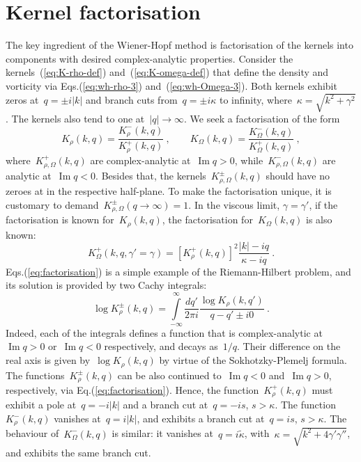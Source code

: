 \documentclass[preprint,aps,eqsecnum]{revtex4-1}
\newcommand{\fplus}[1]{{#1}^{+}}
\newcommand{\fminus}[1]{{#1}^{-}}
\newcommand{\fplusminus}[1]{{#1}^{\pm}}
\renewcommand{\Im}{\mathop{\mathrm{Im}}\nolimits}
\begin{document}
\section{Kernel factorisation}
\label{sec:factorisation}
The key ingredient of the Wiener-Hopf method is factorisation of the kernels
into components with desired complex-analytic properties.
Consider the kernels~(\ref{eq:K-rho-def}) and~(\ref{eq:K-omega-def})
that define the density and vorticity via Eqs.(\ref{eq:wh-rho-3})
and~(\ref{eq:wh-Omega-3}).
Both  kernels exhibit zeros at~$q = \pm i |k|$ and branch cuts
from~$q = \pm i \kappa$ to infinity, where~$\kappa = \sqrt{k^2 + \gamma^2}$.
The kernels also
tend to one at~$|q| \to \infty$. We seek a factorisation of the form
\begin{equation}
  \label{eq:factorisation}
  K_\rho(k, q) = \frac{\fminus{K}_\rho(k, q)}{\fplus{K}_\rho(k, q)}
  \ ,
  \qquad
  K_\Omega(k, q) = \frac{\fminus{K}_\Omega(k, q)}{\fplus{K}_\Omega(k, q)}
  \ ,
\end{equation}
where~$\fplus{K}_{\rho, \Omega}(k, q)$ are complex-analytic at~$\Im q > 0$,
while~$\fminus{K}_{\rho, \Omega}(k, q)$ are analytic at~$\Im q < 0$.
Besides that, the kernels~$\fplusminus{K}_{\rho, \Omega}(k, q)$ should have no
zeroes at in the respective half-plane.
To make the factorisation unique, it is customary
to demand~$\fplusminus{K}_{\rho, \Omega}(q\to \infty) = 1$.
In the viscous limit, $\gamma = \gamma'$,
if the factorisation is known for~$K_\rho(k, q)$,
 the factorisation for~$K_\Omega(k, q)$ is also known:
\begin{equation}
  \fplus{K}_\Omega(k, q, \gamma'=\gamma) = \left[\fplus{K}_\rho(k, q)\right]^2
                              \frac{|k| - iq}{\kappa - iq}
  \ .
\end{equation}
Eqs.(\ref{eq:factorisation})  is  a simple example of
the Riemann-Hilbert problem, and its solution is provided by two Cachy integrals:
\begin{equation}
  \label{eq:factor-cauchy}
  \log\fplusminus{K}_\rho(k, q)
  = \int\limits_{-\infty}^{\infty} \frac{dq'}{2\pi i}
    \frac{\log K_\rho(k, q') }{q - q' \pm i0}
  \ .
\end{equation}
Indeed, each of the integrals defines a function that is complex-analytic
at~\mbox{$\Im q > 0$} or~\mbox{$\Im q < 0$} respectively,
and decays as~$1/q$.
Their difference on the real axis is given by~$\log K_\rho(k, q)$ by virtue
of the Sokhotzky-Plemelj formula. The functions~$\fplusminus{K}_\rho(k, q)$
can be also continued to~$\Im q < 0$ and~$\Im q > 0$, respectively,
via Eq.(\ref{eq:factorisation}). Hence, the function~$\fplus{K}_\rho(k, q)$ must
exhibit a pole at~$q = -i |k|$ and a branch cut at~$q = -is$, $s > \kappa$.
The function~$\fminus{K}_\rho(k, q)$ vanishes at~$q = i |k|$,
and exhibits a branch cut at~$q = i s$, $s > \kappa$.
The behaviour of~$\fminus{K}_\Omega(k, q)$ is similar:
it vanishes at~$q = i \tilde{\kappa}$,
with~$\kappa = \sqrt{k^2 + 4 \gamma' \gamma''}$,
and exhibits the same branch cut. 
\end{document}

